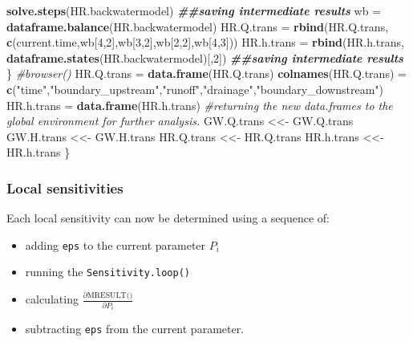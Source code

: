\documentclass[
]{article}
\newenvironment{Shaded}{\begin{snugshade}}{\end{snugshade}}
\newcommand{\CommentTok}[1]{\textcolor[rgb]{0.56,0.35,0.01}{\textit{#1}}}
\newcommand{\DecValTok}[1]{\textcolor[rgb]{0.00,0.00,0.81}{#1}}
\newcommand{\DocumentationTok}[1]{\textcolor[rgb]{0.56,0.35,0.01}{\textbf{\textit{#1}}}}
\newcommand{\FunctionTok}[1]{\textcolor[rgb]{0.13,0.29,0.53}{\textbf{#1}}}
\newcommand{\NormalTok}[1]{#1}
\newcommand{\OtherTok}[1]{\textcolor[rgb]{0.56,0.35,0.01}{#1}}
\newcommand{\StringTok}[1]{\textcolor[rgb]{0.31,0.60,0.02}{#1}}
\providecommand{\tightlist}{%
  \setlength{\itemsep}{0pt}\setlength{\parskip}{0pt}}
\begin{document}
\begin{Shaded}
\begin{Highlighting}[]
    \FunctionTok{solve.steps}\NormalTok{(HR.backwatermodel)}
    \DocumentationTok{\#\#saving intermediate results}
\NormalTok{    wb }\OtherTok{=} \FunctionTok{dataframe.balance}\NormalTok{(HR.backwatermodel)}
\NormalTok{    HR.Q.trans }\OtherTok{=} \FunctionTok{rbind}\NormalTok{(HR.Q.trans, }\FunctionTok{c}\NormalTok{(current.time,wb[}\DecValTok{4}\NormalTok{,}\DecValTok{2}\NormalTok{],wb[}\DecValTok{3}\NormalTok{,}\DecValTok{2}\NormalTok{],wb[}\DecValTok{2}\NormalTok{,}\DecValTok{2}\NormalTok{],wb[}\DecValTok{4}\NormalTok{,}\DecValTok{3}\NormalTok{]))}
\NormalTok{    HR.h.trans }\OtherTok{=} \FunctionTok{rbind}\NormalTok{(HR.h.trans, }\FunctionTok{dataframe.states}\NormalTok{(HR.backwatermodel)[,}\DecValTok{2}\NormalTok{])}
    \DocumentationTok{\#\#saving intermediate results}
\NormalTok{  \}}
  \CommentTok{\#browser()}
\NormalTok{  HR.Q.trans }\OtherTok{=} \FunctionTok{data.frame}\NormalTok{(HR.Q.trans)}
  \FunctionTok{colnames}\NormalTok{(HR.Q.trans) }\OtherTok{=} \FunctionTok{c}\NormalTok{(}\StringTok{"time"}\NormalTok{,}\StringTok{"boundary\_upstream"}\NormalTok{,}\StringTok{"runoff"}\NormalTok{,}\StringTok{"drainage"}\NormalTok{,}\StringTok{"boundary\_downstream"}\NormalTok{)}
\NormalTok{  HR.h.trans }\OtherTok{=} \FunctionTok{data.frame}\NormalTok{(HR.h.trans)}
  \CommentTok{\#returning the new data.frames to the global environment for further analysis.}
\NormalTok{  GW.Q.trans }\OtherTok{\textless{}\textless{}{-}}\NormalTok{ GW.Q.trans}
\NormalTok{  GW.H.trans }\OtherTok{\textless{}\textless{}{-}}\NormalTok{ GW.H.trans}
\NormalTok{  HR.Q.trans }\OtherTok{\textless{}\textless{}{-}}\NormalTok{ HR.Q.trans}
\NormalTok{  HR.h.trans }\OtherTok{\textless{}\textless{}{-}}\NormalTok{ HR.h.trans}
\NormalTok{\}}
\end{Highlighting}
\end{Shaded}

\hypertarget{local-sensitivities}{%
\subsubsection{Local sensitivities}\label{local-sensitivities}}

Each local sensitivity can now be determined using a sequence of:

\begin{itemize}
\tightlist
\item
  adding \texttt{eps} to the current parameter \(P_i\)
\item
  running the \texttt{Sensitivity.loop()}
\item
  calculating \(\frac{\partial \text{MRESULT()}}{\partial P_i}\)
\item
  subtracting \texttt{eps} from the current parameter.
\end{itemize}
\end{document}
